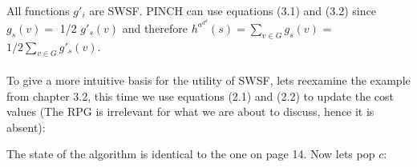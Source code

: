 All functions $g'_i$ are SWSF. PINCH can use equations (3.1) and (3.2) since $g_s(v) =$ 1/2 $g'_s(v)$ and therefore $h^a^d^d(s) = \sum_{v \in G}^{} g_s(v)$ = $1/2 \sum_{v \in G}^{} g'_s(v)$.\\\\
To give a more intuitive basis for the utility of SWSF, lets reexamine the example from chapter 3.2, this time we use equations (2.1) and (2.2) to update the cost values (The RPG is irrelevant for what we are about to discuss, hence it is absent):

\begin{center}
\end{center}
The state of the algorithm is identical to the one on page 14. Now lets pop $c$:

